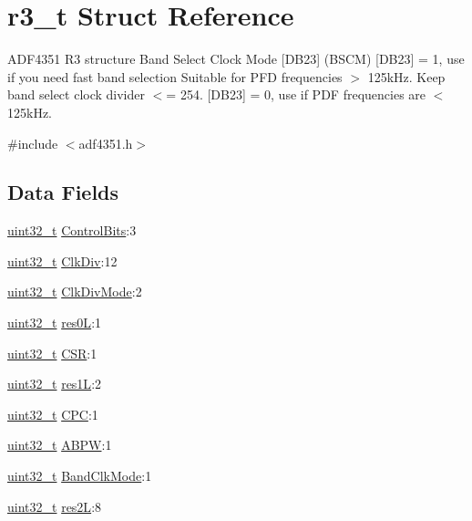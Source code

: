 \hypertarget{structr3__t}{}\section{r3\+\_\+t Struct Reference}
\label{structr3__t}


A\+D\+F4351 R3 structure Band Select Clock Mode \mbox{[}D\+B23\mbox{]} (B\+S\+CM) \mbox{[}D\+B23\mbox{]} = 1, use if you need fast band selection Suitable for P\+FD frequencies $>$ 125k\+Hz. Keep band select clock divider $<$= 254. \mbox{[}D\+B23\mbox{]} = 0, use if P\+DF frequencies are $<$ 125k\+Hz.  




{\ttfamily \#include $<$adf4351.\+h$>$}

\subsection*{Data Fields}
\begin{DoxyCompactItemize}
\item 
\hyperlink{send_8c_a435d1572bf3f880d55459d9805097f62}{uint32\+\_\+t} \hyperlink{structr3__t_a4d5d480a6e629c07e0bb5575fb0023bb}{Control\+Bits}\+:3
\item 
\hyperlink{send_8c_a435d1572bf3f880d55459d9805097f62}{uint32\+\_\+t} \hyperlink{structr3__t_ad53a3132e2a6601f80cb4e455a4dea49}{Clk\+Div}\+:12
\item 
\hyperlink{send_8c_a435d1572bf3f880d55459d9805097f62}{uint32\+\_\+t} \hyperlink{structr3__t_a29d101adb2cb66623bba16d9783cf752}{Clk\+Div\+Mode}\+:2
\item 
\hyperlink{send_8c_a435d1572bf3f880d55459d9805097f62}{uint32\+\_\+t} \hyperlink{structr3__t_aa10065b1b2c2aed70a9e4427e76db29a}{res0L}\+:1
\item 
\hyperlink{send_8c_a435d1572bf3f880d55459d9805097f62}{uint32\+\_\+t} \hyperlink{structr3__t_a295a90a5720da8b88db8bf1420c806e2}{C\+SR}\+:1
\item 
\hyperlink{send_8c_a435d1572bf3f880d55459d9805097f62}{uint32\+\_\+t} \hyperlink{structr3__t_ab655f5b258ae1446791fbe557680daa6}{res1L}\+:2
\item 
\hyperlink{send_8c_a435d1572bf3f880d55459d9805097f62}{uint32\+\_\+t} \hyperlink{structr3__t_a61a4e7b02af2c11e18e823eac349fabf}{C\+PC}\+:1
\item 
\hyperlink{send_8c_a435d1572bf3f880d55459d9805097f62}{uint32\+\_\+t} \hyperlink{structr3__t_a5f81f8e2e2dedd4c4b7d939e51ae2c4c}{A\+B\+PW}\+:1
\item 
\hyperlink{send_8c_a435d1572bf3f880d55459d9805097f62}{uint32\+\_\+t} \hyperlink{structr3__t_a47117d4da83d72bd3e84a4f1f9804120}{Band\+Clk\+Mode}\+:1
\item 
\hyperlink{send_8c_a435d1572bf3f880d55459d9805097f62}{uint32\+\_\+t} \hyperlink{structr3__t_a2a1f40b19f451868336ca6558f653f1d}{res2L}\+:8
\end{DoxyCompactItemize}


